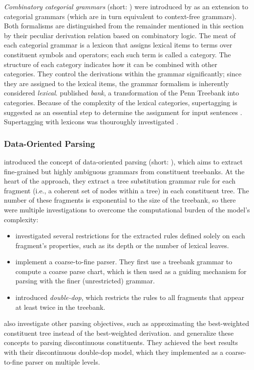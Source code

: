 \documentclass[../document.tex]{subfiles}
\begin{document}
    \emph{Combinatory categorial grammars} (short: ) were introduced by \citet{Ste11} as an extension to categorial grammars (which are in turn equivalent to context-free grammars).
    Both formalisms are distinguished from the remainder mentioned in this section by their peculiar derivation relation based on combinatory logic.
    The meat of each categorial grammar is a lexicon that assigns lexical items to terms over constituent symbols and operators; each such term is called a category.
    The structure of each category indicates how it can be combined with other categories.
    They control the derivations within the grammar significantly; since they are assigned to the lexical items, the grammar formalism is inherently considered \emph{lexical}.
     published \emph{ bank}, a transformation of the Penn Treebank into  categories.
    Because of the complexity of the lexical categories, supertagging is suggested as an essential step to determine the assignment for input sentences \citep{Clark04}.
    Supertagging with  lexicons was thouroughly investigated \citep{clark2002supertagging, LewisSteedman14, vaswani2016supertagging, Kad18, StaSte20}.

    \subsubsection*{Data-Oriented Parsing}
     introduced the concept of data-oriented parsing (short: ), which aims to extract fine-grained but highly ambiguous grammars from constituent treebanks.
    At the heart of the approach, they extract a tree substitution grammar rule for each fragment (i.e.\@, a coherent set of nodes within a tree) in each constituent tree.
    The number of these fragments is exponential to the size of the treebank, so there were multiple investigations to overcome the computational burden of the model's complexity:
    \begin{itemize}
        \item \citet{Bod01} investigated several restrictions for the extracted rules defined solely on each fragment's properties, such as its depth or the number of lexical leaves.
        \item \citet{Ban10} implement a coarse-to-fine parser. They first use a treebank grammar to compute a coarse parse chart, which is then used as a guiding mechanism for parsing with the finer (unrestricted)  grammar.
        \item \citet{San11} introduced \emph{double-dop}, which restricts the rules to all fragments that appear at least twice in the treebank.
    \end{itemize}
     also investigate other parsing objectives, such as approximating the best-weighted constituent tree instead of the best-weighted derivation.
     and \cite{CraSchBod16} generalize these concepts to parsing discontinuous constituents.
    They achieved the best results with their discontinuous double-dop model, which they implemented as a coarse-to-fine parser on multiple levels.
\end{document}
